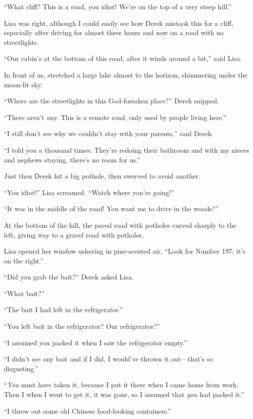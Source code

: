 ``What cliff? This is a road, you idiot! We're on the top of a very
steep hill.''

Lisa was right, although I could easily see how Derek mistook this for a
cliff, especially after driving for almost three hours and now on a road
with no streetlights.

``Our cabin's at the bottom of this road, after it winds around a bit,''
said Lisa.

In front of us, stretched a large lake almost to the horizon, shimmering
under the moon-lit sky.

``Where are the streetlights in this God-forsaken place?'' Derek
snipped.

``There aren't any. This is a remote road, only used by people living
here.''

``I still don't see why we couldn't stay with your parents,'' said
Derek.

``I told you a thousand times: They're redoing their bathroom and with
my nieces and nephews staying, there's no room for us.''

Just then Derek hit a big pothole, then swerved to avoid another.

``You idiot!'' Lisa screamed. ``Watch where you're going!''

``It was in the middle of the road! You want me to drive in the woods?''

At the bottom of the hill, the paved road with potholes curved sharply
to the left, giving way to a gravel road with potholes.

Lisa opened her window ushering in pine-scented air. ``Look for Number
197; it's on the right.''

``Did you grab the bait?'' Derek asked Lisa.

``What bait?''

``The bait I had left in the refrigerator.''

``You left bait in the refrigerator? Our refrigerator?''

``I assumed you packed it when I saw the refrigerator empty.''

``I didn't see any bait and if I did, I would've thrown it out---that's
so disgusting.''

``\emph{You} must have taken it, because I put it there when I came home
from work. Then I when I went to get it, it was gone, so I assumed that
\emph{you} had packed it.''

``I threw out some old Chinese food-looking containers.''

